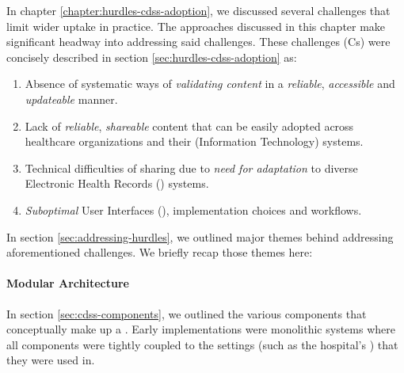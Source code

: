 In chapter \ref{chapter:hurdles-cdss-adoption}, we discussed several
challenges that limit wider \CDSSs{} uptake in practice. The
approaches discussed in this chapter make significant headway into
addressing said challenges. These challenges (Cs) were concisely
described in section \ref{sec:hurdles-cdss-adoption} as:
\begin{enumerate}[label=C\arabic*.]
\itemsep0.0em
\item Absence of systematic ways of \emph{validating content}
in a \emph{reliable}, \emph{accessible} and \emph{updateable} manner.
\item Lack of \emph{reliable}, \emph{shareable} \CDSS{} content
that can be easily adopted across healthcare organizations and their (Information
Technology) \IT{} systems.
\item Technical difficulties of sharing due to \emph{need for
  adaptation} to diverse Electronic Health Records (\EHR) systems.
\item \emph{Suboptimal} User Interfaces (\UIs), implementation choices and
workflows.
\end{enumerate}

In section \ref{sec:addressing-hurdles}, we outlined major
themes behind addressing aforementioned challenges. We briefly
recap those themes here:

\paragraph{Modular Architecture}

In section \ref{sec:cdss-components}, we outlined the various
components that conceptually make up a \CDSS{}.
Early \CDSS{} implementations were monolithic systems where
all components were tightly coupled to the settings (such as
the hospital's \EHR{}) that they were used in.







